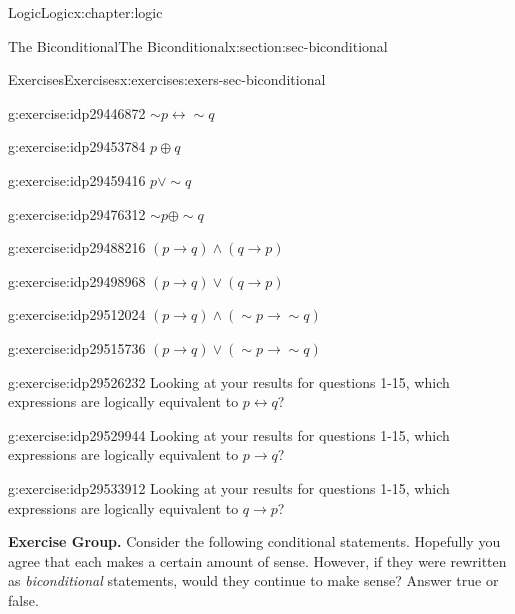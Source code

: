 \documentclass[twoside,10pt,]{book}
\numberwithin{equation}{section}
\newcommand{\conditional}{{p {\rightarrow} q}}
\newcommand{\inverse}{{\sim\!{p}{} {\rightarrow} \sim\!{q}{}}}
\newcommand{\converse}{{q {\rightarrow} p}}
\newcommand{\biconditional}{{p {\leftrightarrow}{} q}}
\begin{document}
\begin{chapterptx}{Logic}{}{Logic}{}{}{x:chapter:logic}
\begin{sectionptx}{The Biconditional}{}{The Biconditional}{}{}{x:section:sec-biconditional}
\begin{exercises-subsection}{Exercises}{}{Exercises}{}{}{x:exercises:exers-sec-biconditional}
\begin{exercisegroup}
\begin{divisionexerciseeg}{8}{}{}{g:exercise:idp29446872}
\(\sim\!{p}{\leftrightarrow}\sim\!{q} \)\end{divisionexerciseeg}%
\begin{divisionexerciseeg}{9}{}{}{g:exercise:idp29453784}%
\(p{\oplus} q \)\end{divisionexerciseeg}%
\begin{divisionexerciseeg}{10}{}{}{g:exercise:idp29459416}%
\(p{\vee}\sim\!{q} \)\end{divisionexerciseeg}%
\begin{divisionexerciseeg}{11}{}{}{g:exercise:idp29476312}%
\(\sim\!{p}{\oplus}\sim\!{q} \)\end{divisionexerciseeg}%
\begin{divisionexerciseeg}{12}{}{}{g:exercise:idp29488216}%
\((\conditional){\wedge}(\converse) \)\end{divisionexerciseeg}%
\begin{divisionexerciseeg}{13}{}{}{g:exercise:idp29498968}%
\((\conditional){\vee}(\converse) \)\end{divisionexerciseeg}%
\begin{divisionexerciseeg}{14}{}{}{g:exercise:idp29512024}%
\((\conditional){\wedge}(\inverse) \)\end{divisionexerciseeg}%
\begin{divisionexerciseeg}{15}{}{}{g:exercise:idp29515736}%
\((\conditional){\vee}(\inverse) \)\end{divisionexerciseeg}%
\end{exercisegroup}
\par\medskip\noindent
\begin{divisionexercise}{16}{}{}{g:exercise:idp29526232}%
Looking at your results for questions 1-15, which expressions are logically equivalent to \(\biconditional\)?\end{divisionexercise}%
\begin{divisionexercise}{17}{}{}{g:exercise:idp29529944}%
Looking at your results for questions 1-15, which expressions are logically equivalent to \(\conditional\)?\end{divisionexercise}%
\begin{divisionexercise}{18}{}{}{g:exercise:idp29533912}%
Looking at your results for questions 1-15, which expressions are logically equivalent to \(\converse\)?\end{divisionexercise}%
\par\medskip\noindent%
\textbf{Exercise Group.}\space\space%
Consider the following conditional statements.  Hopefully you agree that each makes a certain amount of sense.  However, if they were rewritten as \emph{biconditional} statements, would they continue to make sense?  Answer true or false.\begin{exercisegroup}

\end{exercisegroup}
\end{exercises-subsection}
\end{sectionptx}
\end{chapterptx}
\end{document}
